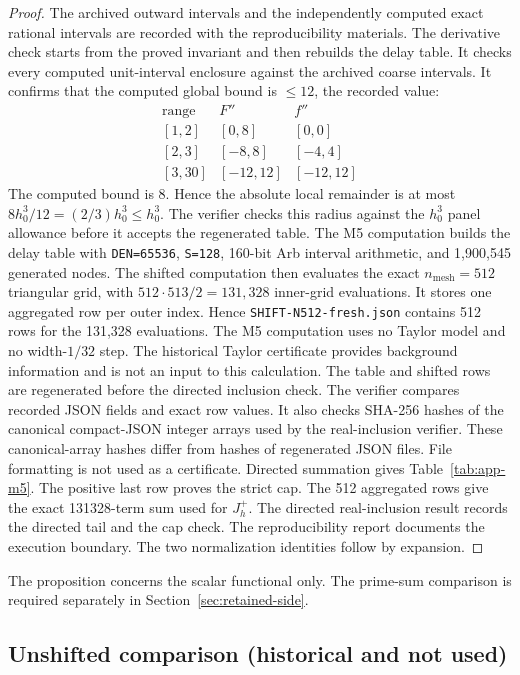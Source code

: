 \begin{proof}
The archived outward intervals and the independently computed exact rational
intervals are recorded with the reproducibility materials. The derivative
check starts from the proved invariant and then rebuilds the delay table.
It checks every computed unit-interval enclosure against the archived coarse
intervals. It confirms that the computed global bound is $\le12$, the
recorded value:
\[
\begin{array}{c|cc}
\text{range}&F''&f''\\ \hline
[1,2]&[0,8]&[0,0]\\
{}[2,3]&[-8,8]&[-4,4]\\
{}[3,30]&[-12,12]&[-12,12]
\end{array}
\]
The computed bound is 8. Hence the absolute local remainder is at most
$8h_0^3/12=(2/3)h_0^3\le h_0^3$. The verifier checks this radius
against the $h_0^3$ panel allowance before it accepts the regenerated
table.
The M5 computation builds the delay table with \texttt{DEN=65536},
\texttt{S=128}, 160-bit Arb
interval arithmetic, and 1,900,545 generated nodes. The shifted computation
then evaluates the exact \(n_{\mathrm{mesh}}=512\) triangular
grid, with \(512\cdot513/2=131,328\) inner-grid evaluations. It stores
one aggregated row per outer index. Hence \texttt{SHIFT-N512-fresh.json} contains 512
rows for the 131,328 evaluations.
The M5 computation uses no Taylor model and no width-\(1/32\) step.
The historical Taylor certificate provides background information and is not an input to this calculation. The table and
shifted rows are regenerated before the directed inclusion check. The
verifier compares recorded JSON fields and exact row values. It also checks
SHA-256 hashes of the canonical compact-JSON integer arrays used by the
real-inclusion verifier. These canonical-array hashes differ from hashes
of regenerated JSON files. File formatting is not used as a certificate.
Directed summation gives Table~\ref{tab:app-m5}.
The positive last row proves the strict cap. The 512 aggregated rows give the exact 131328-term sum
used for \(J_h^+\). The directed real-inclusion result records the directed
tail and the cap check. The reproducibility report documents the execution
boundary.
The two normalization identities follow by expansion.
\end{proof}

The proposition concerns the scalar functional only.
The prime-sum comparison is required separately in Section~\ref{sec:retained-side}.

\subsection{Unshifted comparison (historical and not used)}\label{subsec:app-g24}

